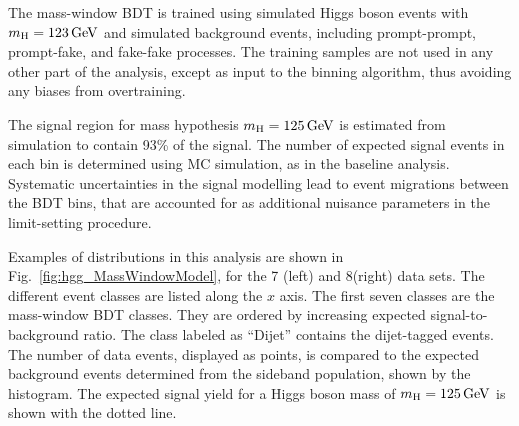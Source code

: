 \documentclass[11pt,twoside,a4paper,cmspaper,final,collab]{cms-tdr}
\begin{document}
The mass-window BDT is trained using simulated Higgs boson events with
$m_{\mathrm{H}}=123\,\text{Ge\hspace{-.08em}V}$ and simulated background events, including prompt-prompt,
prompt-fake, and fake-fake processes.
The training samples are not used in any other part of the analysis,
except as input to the binning algorithm, thus
avoiding any biases from overtraining.

The signal region for mass hypothesis $m_{\mathrm{H}}=125\,\text{Ge\hspace{-.08em}V}$
is estimated from simulation to contain 93\% of the signal.
The number of expected signal events in each bin is determined using MC simulation, as in the
baseline analysis. Systematic uncertainties in the signal modelling lead to
event migrations between the BDT  bins, that are accounted for as
additional nuisance parameters in the limit-setting procedure.


Examples of distributions in this analysis are shown in Fig.~\ref{fig:hgg_MassWindowModel},
for the 7 (left) and 8\TeV (right) data sets.
The different event classes are listed along the $x$ axis. The first seven classes
are the mass-window BDT classes.
They are ordered by increasing expected signal-to-background ratio.
The class labeled as ``Dijet'' contains the dijet-tagged events.
The number of data events, displayed as points, is compared to the expected background events determined from the sideband population,
shown by the histogram.
The expected signal yield for a Higgs boson mass of $m_{\mathrm{H}}=125\,\text{Ge\hspace{-.08em}V}$ is shown
with the dotted line.
\end{document}

